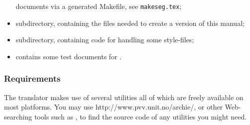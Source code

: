 \begin{itemize}
\begin{changebar}
documents via a generated Makefile, see \verb/makeseg.tex/;
\end{changebar}
\item {} subdirectory, containing the files needed to create
a version of this manual;
\item {} subdirectory, containing \Perl{} code for handling
some style-files;
\item {} contains some test documents for \latextohtml.
\end{itemize}

\htmlrule
\tableofchildlinks

\subsubsection{Requirements}%
\html{\\}%
The translator makes use of several utilities all of which
are freely available on most platforms.
You may use \htmladdnormallinkfoot{\html{ }}%
{http://www.pvv.unit.no/archie/},
or other Web-searching tools such as %
,
to find the source code of any utilities you might need.

